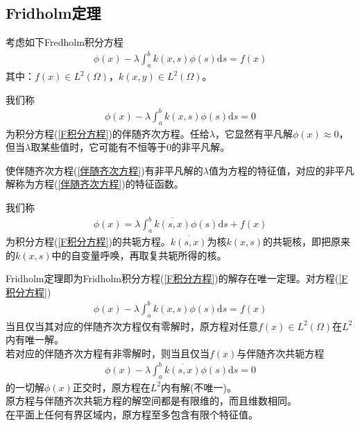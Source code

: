 	\subsection{Fridholm定理}
		\par
		考虑如下Fredholm积分方程
		\begin{align}
			\label{F积分方程}
			\phi(x) - \lambda\int_a^bk(x,s)\phi(s)\mathrm{d}s = f(x)
		\end{align}
		其中：$f(x) \in L^2(\Omega)$，$k(x,y)\in L^2(\Omega)$。
        \begin{definition}[伴随齐次方程]
        我们称
        \begin{align}
            \label{伴随齐次方程}
            \phi(x) - \lambda\int_a^bk(x,s)\phi(s)\mathrm{d}s = 0
        \end{align}
        为积分方程(\ref{F积分方程})的伴随齐次方程。任给$\lambda$，它显然有平凡解$\phi(x) \approx 0$，但当$\lambda$取某些值时，它可能有不恒等于$0$的非平凡解。
        \end{definition}
        \begin{definition}[特征值]
        使伴随齐次方程(\ref{伴随齐次方程})有非平凡解的$\lambda$值为方程的特征值，对应的非平凡解称为方程(\ref{伴随齐次方程})的特征函数。
        \end{definition}
        \begin{definition}[共轭方程]
        我们称
        \begin{align*}
            \phi(x) = \lambda\int_a^b \overline{k(s,x)}\phi(s)\mathrm{d}s + f(x)
        \end{align*}
        为积分方程(\ref{F积分方程})的共轭方程。$\overline{k(s,x)}$为核$k(x,s)$的共轭核，即把原来的$k(x,s)$中的自变量呼唤，再取复共轭所得的核。
        \end{definition}
        \begin{theorem}[Fridholm定理]
        Fridholm定理即为Fridholm积分方程(\ref{F积分方程})的解存在唯一定理。对方程(\ref{F积分方程})
        \begin{align*}
            \phi(x) - \lambda\int_a^bk(x,s)\phi(s)\mathrm{d}s = f(x)
        \end{align*}
        当且仅当其对应的伴随齐次方程仅有零解时，原方程对任意$f(x)\in L^2(\Omega)$在$L^2$内有唯一解。\\
        若对应的伴随齐次方程有非零解时，则当且仅当$f(x)$与伴随齐次共轭方程
        \begin{align*}
            \phi(x) - \lambda\int_a^b \overline{k(s,x)}\phi(s)\mathrm{d}s = 0
        \end{align*}
        的一切解$\phi(x)$正交时，原方程在$L^2$内有解(不唯一)。\\
        原方程与伴随齐次共轭方程的解空间都是有限维的，而且维数相同。\\
        在平面上任何有界区域内，原方程至多包含有限个特征值。
        \end{theorem}


